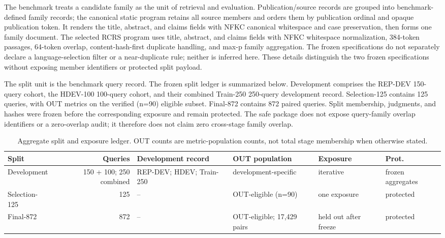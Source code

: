 \documentclass[final,5p,times,twocolumn]{elsarticle}
\newenvironment{widejournal}{\begin{table}[!t]}{\end{table}}
\newcommand{\journalTableFont}{\footnotesize}
\newenvironment{widejournal}{\begin{table}[!htbp]}{\end{table}}
\newcommand{\journalTableFont}{\footnotesize}
\begin{document}
The benchmark treats a candidate family as the unit of retrieval and
evaluation. Publication/source records are grouped into benchmark-defined
family records; the canonical static program retains all source members and
orders them by publication ordinal and opaque publication token. It renders
the title, abstract, and claims fields with NFKC canonical whitespace and
case preservation, then forms one family document. The selected RCRS program
uses title, abstract, and claims fields with NFKC whitespace normalization,
384-token passages, 64-token overlap, content-hash-first duplicate handling,
and max-p family aggregation. The frozen specifications do not separately
declare a language-selection filter or a near-duplicate rule; neither is
inferred here. These details distinguish the two frozen specifications without
exposing member identifiers or protected split payload.

The split unit is the benchmark query record. The frozen split ledger is
summarized below. Development comprises the
REP-DEV 150-query cohort, the HDEV-100 100-query cohort, and their combined
Train-250 250-query development record. Selection-125 contains 125 queries,
with OUT metrics on the verified (n=90) eligible subset. Final-872 contains
872 paired queries. Split membership, judgments, and hashes were frozen before
the corresponding exposure and remain protected. The safe package does not
expose query-family overlap identifiers or a zero-overlap audit; it therefore
does not claim zero cross-stage family overlap.

\begin{widejournal}
\caption{Aggregate split and exposure ledger. OUT counts are metric-population
counts, not total stage membership when otherwise stated.}
\label{tab:split-ledger}
\centering
\journalTableFont
\scriptsize
\setlength{\tabcolsep}{2pt}
\sloppy
\begin{tabularx}{\textwidth}{@{}P{1.7cm}r P{1.8cm}P{2.1cm}P{1.7cm}Y@{}}
\toprule
Split & Queries & Development record & OUT population & Exposure & Prot. \\
\midrule
Development & 150 + 100; 250 combined & REP-DEV; HDEV; Train-250 & development-specific & iterative & frozen aggregates \\
Selection-125 & 125 & -- & OUT-eligible (n=90) & one exposure & protected \\
Final-872 & 872 & -- & OUT-eligible; 17,429 pairs & held out after freeze & protected \\
\bottomrule
\end{tabularx}
\end{widejournal}
\end{document}

